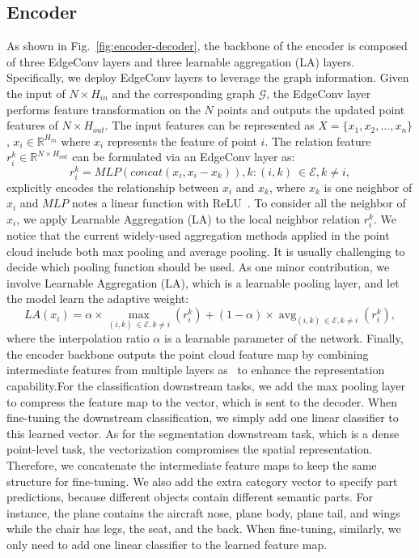 \documentclass[journal]{IEEEtran}
\begin{document}
\subsection{Encoder}
As shown in Fig.~\ref{fig:encoder-decoder}, the backbone of the encoder is composed of three EdgeConv layers and three learnable aggregation (LA) layers. Specifically, we deploy EdgeConv layers to leverage the graph information. Given the input of $N\times H_{in}$ and the corresponding graph $\mathcal{G}$, the EdgeConv layer performs feature transformation on the $N$ points and outputs the updated point features of $N\times H_{out}$. The input features can be represented as $X=\{x_1, x_2,...,x_n\}$, $x_i \in \mathbb{R}^{H_{in}}$ where $x_i$ represents the feature of point $i$. The relation feature $r_i^k \in \mathbb{R}^{N \times H_{out}}$ can be formulated via an EdgeConv layer as:
{\setlength\abovedisplayskip{0.15cm}
     \setlength\belowdisplayskip{0.15cm}
\begin{equation}
r_i^k=MLP(concat(x_i, x_i-x_k)),k:(i,k)~\in \mathcal{E}, k \neq i,
\end{equation}}
explicitly encodes the relationship between $x_i$ and $x_k$, where $x_k$ is one neighbor of $x_i$ and $MLP$ notes a linear function with ReLU~\cite{nair2010rectified}.
To consider all the neighbor of $x_i$, we apply Learnable Aggregation (LA) to the local neighbor relation $r^k_i$. 
We notice that the current widely-used aggregation methods applied in the point cloud include both max pooling and average pooling. It is usually challenging to decide which pooling function should be used. As one minor contribution, we involve Learnable Aggregation (LA), which is a learnable pooling layer, and let the model learn the adaptive weight:
    {\setlength\abovedisplayskip{0.15cm}
     \setlength\belowdisplayskip{0.15cm}
    \begin{equation}
        LA(x_i) = \alpha \times \mathop{max}_{(i,k)~\in \mathcal{E}, k \neq i}(r_i^k) + (1-\alpha)\times \mathop{avg}_{(i,k)~\in \mathcal{E}, k \neq i}(r_i^k),
        \label{lmmp}
    \end{equation}
    }
where the interpolation ratio $\alpha$ is a learnable parameter of the network. 
Finally, the encoder backbone outputs the point cloud feature map by combining intermediate features from multiple layers as~\cite{yang2021multiple} to enhance the representation capability.For the classification downstream tasks, we add the max pooling layer to compress the feature map to the vector, which is sent to the decoder. When fine-tuning the downstream classification, we simply add one linear classifier to this learned vector. 
As for the segmentation downstream task, which is a dense point-level task, the vectorization compromises the spatial representation.  Therefore, we concatenate the intermediate feature maps to keep the same structure for fine-tuning. We also add the extra category vector to specify part predictions, because different objects contain different semantic parts. For instance, the plane contains the aircraft nose, plane body, plane tail, and wings while the chair has legs, the seat, and the back. When fine-tuning, similarly, we only need to add one linear classifier to the learned feature map. 
\end{document}

